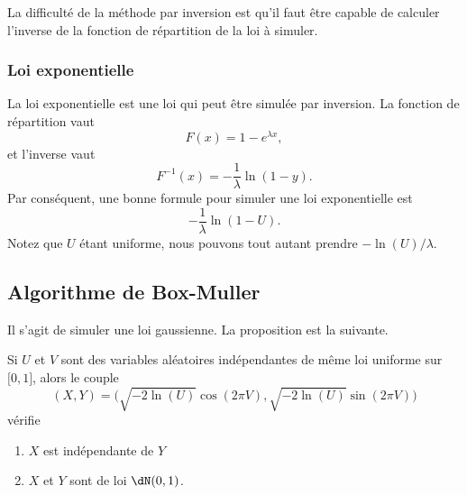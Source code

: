 La difficulté de la méthode par inversion est qu'il faut être capable de calculer l'inverse de la fonction de répartition de la loi à simuler.

\subsubsection{Loi exponentielle}

La loi exponentielle est une loi qui peut être simulée par inversion. La fonction de répartition vaut
\begin{equation}
    F(x)=1- e^{\lambda x},
\end{equation}
et l'inverse vaut
\begin{equation}
    F^{-1}(x)=-\frac{1}{ \lambda }\ln(1-y).
\end{equation}
Par conséquent, une bonne formule pour simuler une loi exponentielle est
\begin{equation}
    -\frac{1}{ \lambda }\ln(1-U).
\end{equation}
Notez que \( U\) étant uniforme, nous pouvons tout autant prendre \( -\ln(U)/\lambda\).

\subsection{Algorithme de Box-Muller}

Il s'agit de simuler une loi gaussienne. La proposition est la suivante.

\begin{proposition}
    Si \( U\) et \( V\) sont des variables aléatoires indépendantes de même loi uniforme sur \( \mathopen[ 0 , 1 \mathclose]\), alors le couple
    \begin{equation}
        (X,Y)=\big( \sqrt{-2\ln(U)}\cos(2\pi V),\sqrt{-2\ln(U)}\sin(2\pi V) \big)
    \end{equation}
    vérifie
    \begin{enumerate}
        \item
            \( X\) est indépendante de \( Y\)
        \item
            \( X\) et \( Y\) sont de loi \( \dN(0,1)\).
    \end{enumerate}
\end{proposition}

